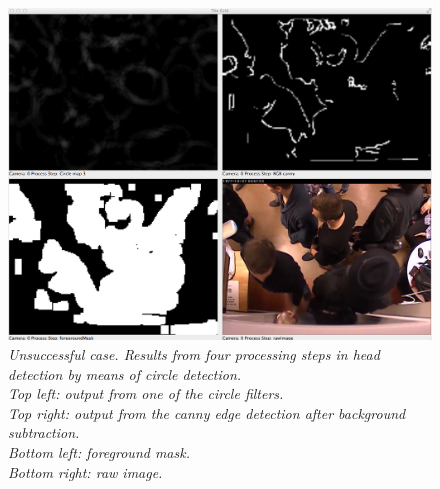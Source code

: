 \newpage
\begin{figure}[htb]
	\centering
	\includegraphics[width=\linewidth]{images/circle_detection_fail.png}
	\caption[An example of a failed Hough-circle detection]{\textit{
		Unsuccessful case. Results from four processing steps in head detection by means of circle detection.\\
	Top left: output from one of the circle filters.\\
	Top right: output from the canny edge detection after background subtraction.\\
	Bottom left: foreground mask. \\
	Bottom right: raw image.}}
	\label{fig:circle_fail}  %
\end{figure}

